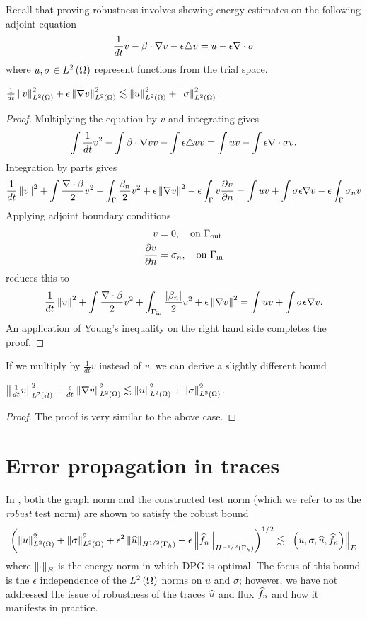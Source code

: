 Recall that proving robustness involves showing energy estimates on the following adjoint equation
\[
\frac{1}{dt}v - \beta\cdot \grad v - \epsilon\del v = u - \epsilon\div \sigma
\]
where $u, \sigma \in \L$ represent functions from the trial space.  
\begin{lemma}
$\frac{1}{dt}\nor{v}_{\L}^2 + \epsilon \nor{\grad v}_{\L}^2 \lesssim \nor{u}_{\L}^2 + \nor{\sigma}_{\L}^2.$
\end{lemma}
\begin{proof}
Multiplying the equation by $v$ and integrating gives
\[
\int \frac{1}{dt} v^2 - \int \beta \cdot \grad v v -  \int \epsilon \del v v = \int u v -  \int \epsilon \div \sigma v.
\]
Integration by parts gives
\[
\frac{1}{dt} \nor{v}^2 + \int \frac{\div \beta}{2} v^2 - \int_\Gamma \frac{\beta_n}{2}v^2 + \epsilon \nor{\grad v}^2 - \epsilon \int_\Gamma v\pd{v}{n}  = \int uv + \int \sigma \epsilon \grad v  - \epsilon \int_\Gamma \sigma_n v
\]
Applying adjoint boundary conditions 
\begin{align*}
v &= 0, \quad \text{on } \Gamma_{\rm out}\\
\pd{v}{n} &= \sigma_n, \quad \text{on } \Gamma_{\rm in}
\end{align*}
reduces this to
\[
\frac{1}{dt} \nor{v}^2 + \int \frac{\div \beta}{2} v^2 + \int_{\Gamma_{\rm in}} \frac{|\beta_n|}{2}v^2 + \epsilon \nor{\grad v}^2 = \int uv + \int \sigma \epsilon \grad v.
\]
An application of Young's inequality on the right hand side completes the proof.  
\end{proof}
If we multiply by $\frac{1}{dt}v$ instead of $v$, we can derive a slightly different bound
\begin{lemma}
$\nor{\frac{1}{dt}v}_{\L}^2 + \frac{\epsilon}{dt} \nor{\grad v}_{\L}^2 \lesssim \nor{u}_{\L}^2 + \nor{\sigma}_{\L}^2$.
\end{lemma}
\begin{proof}
The proof is very similar to the above case. 
\end{proof}

 

\section{Error propagation in traces}

In \cite{DPGrobustness}, both the graph norm and the constructed test norm (which we refer to as the \textit{robust} test norm) are shown to satisfy the robust bound
\[
\LRp{\nor{u}_{\L}^2 + \nor{\sigma}_{\L}^2 + \epsilon^2\nor{\uh}_{H^{1/2}(\Gh)} + \epsilon\nor{\fnh}_{H^{-1/2}(\Gh)}}^{1/2} \lesssim \nor{\LRp{u,\sigma,\uh,\fnh}}_E
\]
where $\nor{\cdot}_E$ is the energy norm in which DPG is optimal.  The focus of this bound is the $\epsilon$ independence of the $\L$ norms on $u$ and $\sigma$; however, we have not addressed the issue of robustness of the traces $\uh$ and flux $\fnh$ and how it manifests in practice.  


